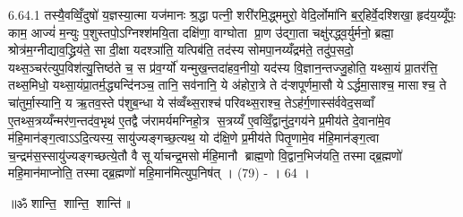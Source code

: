 6.64.1
तस्यै॒वव्विँ॒दुषो॑ य॒ज्ञस्या॒त्मा यज॑मानः श्र॒द्धा पत्नी॒ शरी॑रमि॒द्ध्ममुरो॒ वेदि॒र्लोमा॑नि ब॒र्॒हिर्वे॒दश्शिखा॒ हृद॑य॒य्यूँपः॒ काम॒ आज्यं॑ म॒न्युः प॒शुस्तपो॒ऽग्निश्श॑मयि॒ता दक्षि॑णा॒ वाग्घोता प्रा॒ण उ॑द्गा॒ता चक्षु॑रद्ध्व॒र्युर्मनो॒ ब्रह्मा॒ श्रोत्र॑म॒ग्नीद्याव॒द्ध्रिय॑ते॒ सा दी॒क्षा यदश्ञा॑ति॒ यत्पिब॑ति॒ तद॑स्य सोमपा॒नय्यँद्रम॑ते॒ तदु॑प॒सदो॒ यथ्स॒ञ्चर॑त्युप॒विश॑त्यु॒त्तिष्ठ॑ते च॒ स प्र॑व॒र्ग्यो॑ यन्मुख॒न्तदा॑हव॒नीयो॒ यद॑स्य वि॒ज्ञान॒न्तज्जु॒होति॒ यथ्सा॒यं प्रा॒तर॑त्ति॒ तथ्स॒मिधो॒ यथ्सा॒यंप्रा॒तर्म॒द्ध्यन्दि॑नञ्च॒ तानि॒ सव॑नानि॒ ये अ॑होरा॒त्रे ते द॑ऱ्शपूर्णमा॒सौ येऽर्द्धमा॒साश्च॒ मासाश्च॒ ते चा॑तुर्मा॒स्यानि॒ य ऋ॒तव॒स्ते प॑शुब॒न्धा ये स॑व्वँथ्स॒राश्च॑ परिवथ्स॒राश्च॒ तेऽह॑र्ग॒णास्स॑र्ववेद॒सव्वाँ ए॒तथ्स॒त्रय्यँन्मर॑ण॒न्तद॑व॒भृथ॑ ए॒तद्वै ज॑रामर्यमग्निहो॒त्र स॒त्रय्यँ ए॒वव्विँ॒द्वानु॑द॒गय॑ने प्र॒मीय॑ते दे॒वाना॑मे॒व म॑हि॒मान॑ङ्ग॒त्वाऽऽदि॒त्यस्य॒ सायु॑ज्यङ्गच्छ॒त्यथ॒ यो द॑क्षि॒णे प्र॒मीय॑ते पितृ॒णामे॒व म॑हि॒मान॑ङ्ग॒त्वा च॒न्द्रम॑स॒स्सायु॑ज्यङ्गच्छत्ये॒तौ वै सूर्याचन्द्र॒मसोर्महि॒मानौ ब्राह्म॒णो वि॒द्वान॒भिज॑यति॒ तस्माद्ब्र॒ह्मणो॑ महि॒मान॑माप्नोति॒ तस्माद्ब्र॒ह्मणो॑ महि॒मान॑मित्युप॒निष॑त् । (79) - । 64 ।

\centerline{॥ॐ शान्ति॒ शान्ति॒ शान्ति॑॥}
